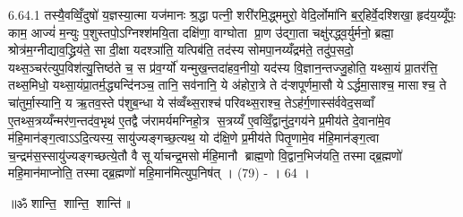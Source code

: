 6.64.1
तस्यै॒वव्विँ॒दुषो॑ य॒ज्ञस्या॒त्मा यज॑मानः श्र॒द्धा पत्नी॒ शरी॑रमि॒द्ध्ममुरो॒ वेदि॒र्लोमा॑नि ब॒र्॒हिर्वे॒दश्शिखा॒ हृद॑य॒य्यूँपः॒ काम॒ आज्यं॑ म॒न्युः प॒शुस्तपो॒ऽग्निश्श॑मयि॒ता दक्षि॑णा॒ वाग्घोता प्रा॒ण उ॑द्गा॒ता चक्षु॑रद्ध्व॒र्युर्मनो॒ ब्रह्मा॒ श्रोत्र॑म॒ग्नीद्याव॒द्ध्रिय॑ते॒ सा दी॒क्षा यदश्ञा॑ति॒ यत्पिब॑ति॒ तद॑स्य सोमपा॒नय्यँद्रम॑ते॒ तदु॑प॒सदो॒ यथ्स॒ञ्चर॑त्युप॒विश॑त्यु॒त्तिष्ठ॑ते च॒ स प्र॑व॒र्ग्यो॑ यन्मुख॒न्तदा॑हव॒नीयो॒ यद॑स्य वि॒ज्ञान॒न्तज्जु॒होति॒ यथ्सा॒यं प्रा॒तर॑त्ति॒ तथ्स॒मिधो॒ यथ्सा॒यंप्रा॒तर्म॒द्ध्यन्दि॑नञ्च॒ तानि॒ सव॑नानि॒ ये अ॑होरा॒त्रे ते द॑ऱ्शपूर्णमा॒सौ येऽर्द्धमा॒साश्च॒ मासाश्च॒ ते चा॑तुर्मा॒स्यानि॒ य ऋ॒तव॒स्ते प॑शुब॒न्धा ये स॑व्वँथ्स॒राश्च॑ परिवथ्स॒राश्च॒ तेऽह॑र्ग॒णास्स॑र्ववेद॒सव्वाँ ए॒तथ्स॒त्रय्यँन्मर॑ण॒न्तद॑व॒भृथ॑ ए॒तद्वै ज॑रामर्यमग्निहो॒त्र स॒त्रय्यँ ए॒वव्विँ॒द्वानु॑द॒गय॑ने प्र॒मीय॑ते दे॒वाना॑मे॒व म॑हि॒मान॑ङ्ग॒त्वाऽऽदि॒त्यस्य॒ सायु॑ज्यङ्गच्छ॒त्यथ॒ यो द॑क्षि॒णे प्र॒मीय॑ते पितृ॒णामे॒व म॑हि॒मान॑ङ्ग॒त्वा च॒न्द्रम॑स॒स्सायु॑ज्यङ्गच्छत्ये॒तौ वै सूर्याचन्द्र॒मसोर्महि॒मानौ ब्राह्म॒णो वि॒द्वान॒भिज॑यति॒ तस्माद्ब्र॒ह्मणो॑ महि॒मान॑माप्नोति॒ तस्माद्ब्र॒ह्मणो॑ महि॒मान॑मित्युप॒निष॑त् । (79) - । 64 ।

\centerline{॥ॐ शान्ति॒ शान्ति॒ शान्ति॑॥}
